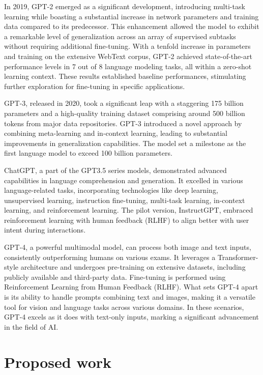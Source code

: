 \documentclass[conference]{IEEEtran}
\begin{document}
In 2019, GPT-2 emerged as a significant development, introducing multi-task learning while boasting a substantial increase in network parameters and training data compared to its predecessor. This enhancement allowed the model to exhibit a remarkable level of generalization across an array of supervised subtasks without requiring additional fine-tuning. With a tenfold increase in parameters and training on the extensive WebText corpus, GPT-2 achieved state-of-the-art performance levels in 7 out of 8 language modeling tasks, all within a zero-shot learning context. These results established baseline performances, stimulating further exploration for fine-tuning in specific applications.

GPT-3, released in 2020, took a significant leap with a staggering 175 billion parameters and a high-quality training dataset comprising around 500 billion tokens from major data repositories. GPT-3 introduced a novel approach by combining meta-learning and in-context learning, leading to substantial improvements in generalization capabilities. The model set a milestone as the first language model to exceed 100 billion parameters.

ChatGPT, a part of the GPT3.5 series models, demonstrated advanced capabilities in language comprehension and generation. It excelled in various language-related tasks, incorporating technologies like deep learning, unsupervised learning, instruction fine-tuning, multi-task learning, in-context learning, and reinforcement learning. The pilot version, InstructGPT, embraced reinforcement learning with human feedback (RLHF) to align better with user intent during interactions.

GPT-4, a powerful multimodal model, can process both image and text inputs, consistently outperforming humans on various exams. It leverages a Transformer-style architecture and undergoes pre-training on extensive datasets, including publicly available and third-party data. Fine-tuning is performed using Reinforcement Learning from Human Feedback (RLHF). What sets GPT-4 apart is its ability to handle prompts combining text and images, making it a versatile tool for vision and language tasks across various domains. In these scenarios, GPT-4 excels as it does with text-only inputs, marking a significant advancement in the field of AI.
 
\section{Proposed work}
\end{document}
